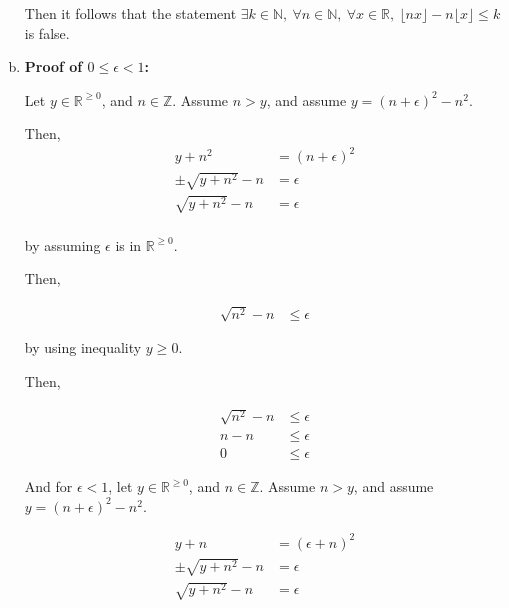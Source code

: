 \documentclass[12pt]{article}
\begin{document}
\begin{enumerate}[a.]
    \bigskip

    Then it follows that the statement $\exists k \in \mathbb{N},\:\forall n \in \mathbb{N},\:
    \forall x \in \mathbb{R},\: \lfloor nx \rfloor - n \lfloor x \rfloor \leq k$ is false.

    \item

    \textbf{Proof of $0 \leq \epsilon < 1$:}

    \bigskip

    Let $y \in \mathbb{R}^{\geq 0}$, and $n \in \mathbb{Z}$. Assume $n >y$, and
    assume $y = (n + \epsilon)^2 - n^2$.

    \bigskip

    Then,
    \setcounter{equation}{0}
    \begin{align}
        y + n^2 &= (n + \epsilon)^2\\
        \pm \sqrt{y + n^2} - n &= \epsilon\\
        \sqrt{y + n^2} - n &= \epsilon\\
    \end{align}

    by assuming $\epsilon$ is in $\mathbb{R}^{\geq 0}$.

    \bigskip

    Then,

    \begin{align}
        \sqrt{n^2} - n &\leq \epsilon
    \end{align}

    by using inequality $y \geq 0$.

    \bigskip

    Then,

    \begin{align}
        \sqrt{n^2} - n &\leq \epsilon\\
        n - n &\leq \epsilon\\
        0 &\leq \epsilon
    \end{align}

    \bigskip

    And for $\epsilon < 1$, let $y \in \mathbb{R}^{\geq 0}$, and $n \in \mathbb{Z}$.
    Assume $n >y$, and assume $y = (n + \epsilon)^2 - n^2$.

    \bigskip

    \begin{align}
        y + n &= (\epsilon + n)^2\\
        \pm \sqrt{y + n^2} - n &= \epsilon\\
        \sqrt{y + n^2} - n &= \epsilon\\
    \end{align}


\end{enumerate}
\end{document}
